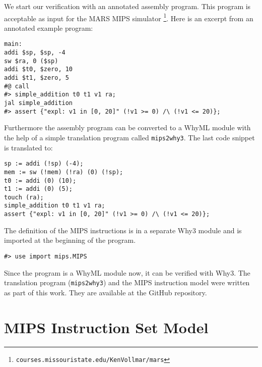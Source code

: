 We start our verification with an annotated assembly program. This program is 
acceptable as input for the MARS MIPS simulator \footnote{\verb"courses.missouristate.edu/KenVollmar/mars"}. 
Here is an excerpt from an annotated example program: 
\begin{lstlisting}
main:
addi $sp, $sp, -4
sw $ra, 0 ($sp)
addi $t0, $zero, 10
addi $t1, $zero, 5
#@ call
#> simple_addition t0 t1 v1 ra;
jal simple_addition
#> assert {"expl: v1 in [0, 20]" (!v1 >= 0) /\ (!v1 <= 20)};
\end{lstlisting}
Furthermore the assembly program can be converted
to a WhyML module with the help of a simple translation program called \verb"mips2why3".
The last code snippet is translated to:
\begin{lstlisting}
sp := addi (!sp) (-4);
mem := sw (!mem) (!ra) (0) (!sp);
t0 := addi (0) (10);
t1 := addi (0) (5);
touch (ra);
simple_addition t0 t1 v1 ra;
assert {"expl: v1 in [0, 20]" (!v1 >= 0) /\ (!v1 <= 20)};
\end{lstlisting}
The definition of the MIPS instructions is in a separate Why3 module and is
imported at the beginning of the program.
\begin{lstlisting}
#> use import mips.MIPS
\end{lstlisting}
Since the program is a WhyML module now, it can be verified with Why3.
The translation program (\verb"mips2why3") and the MIPS instruction model were
written as part of this work. They are available at the GitHub repository.

\section{MIPS Instruction Set Model}

